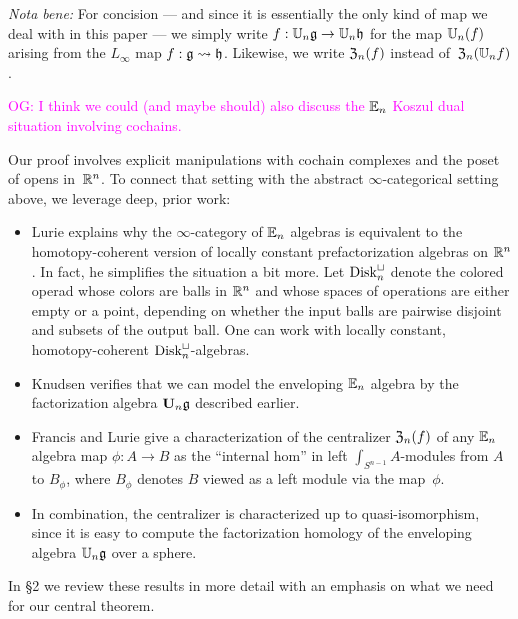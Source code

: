 \documentclass[11pt]{amsart}
\numberwithin{equation}{section}
\def\owen{\textcolor{magenta}{OG: }\textcolor{magenta}}
\begin{document}
{\em Nota bene:}\/ For concision --- and since it is essentially the only kind of map we deal with in this paper --- we simply write $f: \mathbb U_n \mathfrak g \to \mathbb U_n \mathfrak h$ for the map $\mathbb U_n(f)$ arising from the $L_\infty$ map $f: \mathfrak g \rightsquigarrow \mathfrak h$.
Likewise, we write ${\frak Z}_n(f)$ instead of~${\frak Z}_n(\mathbb U_n f)$.

\owen{I think we could (and maybe should) also discuss the $\mathbb E_n$ Koszul dual situation involving cochains.}

\def\Disk{{\rm Disk}}

Our proof involves explicit manipulations with cochain complexes and the poset of opens in~$\mathbb R^n$.
To connect that setting with the abstract $\infty$-categorical setting above,
we leverage deep, prior work:
\begin{itemize}
\item Lurie \cite{LurieHA} explains why the $\infty$-category of $\mathbb E_n$ algebras is equivalent to the homotopy-coherent version of locally constant prefactorization algebras on $\mathbb R^n$.  
In fact, he simplifies the situation a bit more. 
Let $\Disk_n^\sqcup$ denote the colored operad whose colors are balls in $\mathbb R^n$ and whose spaces of operations are either empty or a point, depending on whether the input balls are pairwise disjoint and subsets of the output ball. 
One can work with locally constant, homotopy-coherent $\Disk_n^\sqcup$-algebras.
\item Knudsen verifies that we can model the enveloping $\mathbb E_n$ algebra by the factorization algebra $\mathbf U_n \mathfrak g$ described earlier.
\item Francis and Lurie give a characterization of the centralizer ${\frak Z}_n(f)$ of any $\mathbb E_n$ algebra map $\phi: A \to B$ as the ``internal hom'' in left $\int_{S^{n-1}}A$-modules from $A$ to $B_\phi$, where $B_\phi$ denotes $B$ viewed as a left module via the map~$\phi$.
\item In combination, the centralizer is characterized up to quasi-isomorphism, 
since it is easy to compute the factorization homology of the enveloping algebra $\mathbb U_n \mathfrak g$ over a sphere.
\end{itemize}
In \S2 we review these results in more detail with an emphasis on what we need for our central theorem.
\end{document}
